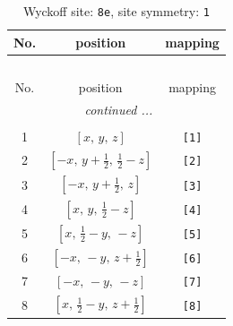 \documentclass[fleqn,8pt]{jsarticle}
\begin{document}
\renewcommand{\arraystretch}{1.2}
\begin{longtable}{ccc}
\caption{Wyckoff site: {\tt 8e}, site symmetry: {\tt 1}}
 \\
 \hline \hline
No. & position & mapping \\ \hline \endfirsthead

\multicolumn{2}{l}{\tablename\ \thetable{}} \\
 \hline \hline
No. & position & mapping \\ \hline \endhead

 \hline \hline
\multicolumn{2}{r}{\footnotesize\it continued ...} \\ \endfoot

 \hline \hline
\multicolumn{2}{r}{} \\ \endlastfoot

1 & $\left[ x,\, y,\, z \right]$ & {\tt [1]} \\ \hline
2 & $\left[ - x,\, y + \frac{1}{2},\, \frac{1}{2} - z \right]$ & {\tt [2]} \\ \hline
3 & $\left[ - x,\, y + \frac{1}{2},\, z \right]$ & {\tt [3]} \\ \hline
4 & $\left[ x,\, y,\, \frac{1}{2} - z \right]$ & {\tt [4]} \\ \hline
5 & $\left[ x,\, \frac{1}{2} - y,\, - z \right]$ & {\tt [5]} \\ \hline
6 & $\left[ - x,\, - y,\, z + \frac{1}{2} \right]$ & {\tt [6]} \\ \hline
7 & $\left[ - x,\, - y,\, - z \right]$ & {\tt [7]} \\ \hline
8 & $\left[ x,\, \frac{1}{2} - y,\, z + \frac{1}{2} \right]$ & {\tt [8]} \\
\end{longtable}
\end{document}
